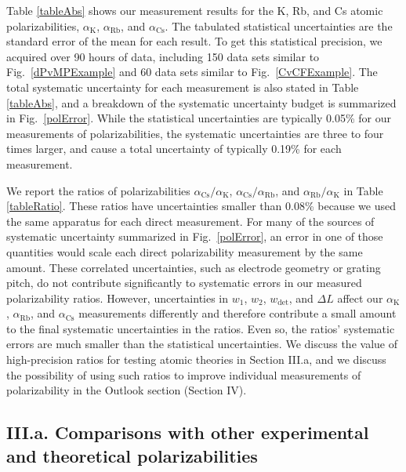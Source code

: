 \documentclass[twocolumn,prl,showpacs,superscriptaddress,longbibliography]{revtex4-1}   %
\newcommand{\figref}[1]{Fig.~\ref{#1}}
\newcommand{\ak}{\alpha_{\textrm{K}}}
\newcommand{\arb}{\alpha_{\textrm{Rb}}}
\newcommand{\acs}{\alpha_{\textrm{Cs}}}
\begin{document}
Table \ref{tableAbs} shows our measurement results for the K, Rb, and Cs atomic polarizabilities, $\ak$, $\arb$, and $\acs$.  The tabulated statistical uncertainties are the standard error of the mean for each result.  To get this statistical precision, we acquired over 90 hours of data, including 150 data sets similar to \figref{dPvMPExample} and 60 data sets similar to \figref{CvCFExample}.   The total systematic uncertainty for each measurement is also stated in Table \ref{tableAbs}, and a breakdown of the systematic uncertainty budget is summarized in \figref{polError}.  While the statistical uncertainties are typically 0.05\% for our measurements of polarizabilities, the systematic uncertainties are three to four times larger, and cause a total uncertainty of typically 0.19\% for each measurement.

We report the ratios of polarizabilities $\acs/\ak$, $\acs/\arb$, and $\arb/\ak$ in Table \ref{tableRatio}.
These ratios have uncertainties smaller than 0.08\% because we used the same apparatus for each direct measurement.
For many of the sources of systematic uncertainty summarized in \figref{polError}, an error in one of those quantities would scale each direct polarizability measurement by the same amount. These correlated uncertainties, such as electrode geometry or grating pitch, do not contribute significantly to systematic errors in our measured polarizability ratios.
However, uncertainties in $w_1$, $w_2$, $w_{\mathrm{det}}$, and $\Delta L$ affect our $\ak$, $\arb$, and $\acs$ measurements differently and therefore contribute a small amount to the final systematic uncertainties in the ratios. Even so, the ratios' systematic errors are much smaller than the statistical uncertainties. 
We discuss the value of high-precision ratios for testing atomic theories in Section III.a, and we discuss the possibility of using such ratios to improve individual measurements of polarizability in the Outlook section (Section IV).


\subsection{III.a. Comparisons with other experimental and theoretical polarizabilities}
\end{document}
